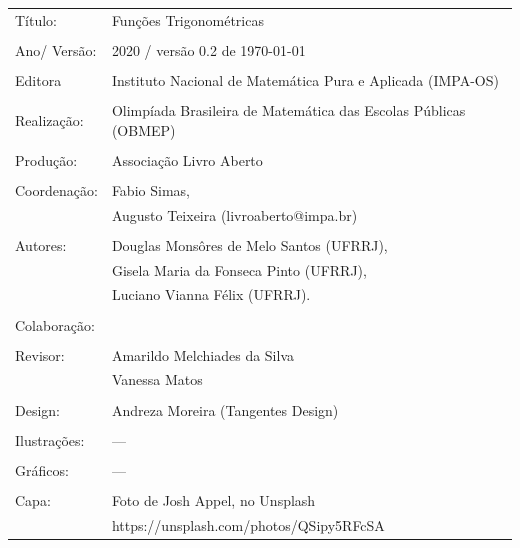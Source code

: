 \begin{tabular}{p{}p{}}
Título: & Funções Trigonométricas\\
\\
Ano/ Versão: & 2020 / versão 0.2 de \today\\
\\
Editora & Instituto Nacional de Matem\'atica Pura e Aplicada (IMPA-OS)\\
\\
Realização:& Olimp\'iada Brasileira de Matem\'atica das Escolas P\'ublicas (OBMEP)\\
\\
Produção:& Associação Livro Aberto\\
\\
Coordenação: & Fabio Simas, \\
			&  Augusto Teixeira (livroaberto@impa.br)\\
\\
  Autores: & Douglas Monsôres de Melo Santos (UFRRJ),\\
        & Gisela Maria da Fonseca Pinto (UFRRJ),\\
             & Luciano Vianna Félix (UFRRJ).\\
        
\\
Colaboração: & \\
\\
Revisor: & Amarildo Melchiades da Silva \\
         & Vanessa Matos \\
\\
Design: & Andreza Moreira (Tangentes Design) \\
\\
  Ilustrações: & --- \\ 
\\
Gráficos: & ---\\
\\
  Capa: & Foto de Josh Appel, no Unsplash \\
  		& https://unsplash.com/photos/QSipy5RFcSA \\

\end{tabular}
\vspace{.5cm}



